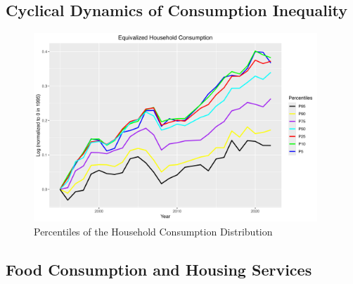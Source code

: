 \documentclass{article}
\begin{document}
\subsection{Cyclical Dynamics of Consumption Inequality}

\begin{figure}
    \centering
    \includegraphics[width=0.95\textwidth]{figures/Fig_7/Fig_7_percentiles_a1995.png}
    \caption{Percentiles of the Household Consumption Distribution}
    \label{fig:Consumption_cyclic}
\end{figure}

\subsection{Food Consumption and Housing Services}
\end{document}
